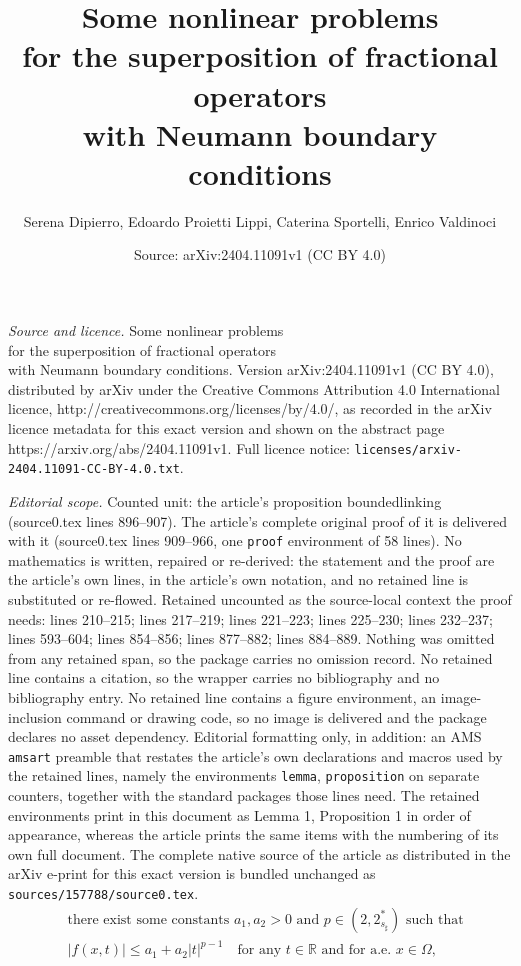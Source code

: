 \documentclass[10pt,a4paper]{amsart}
\title{Some nonlinear problems\\ for the superposition of fractional operators\\ with Neumann boundary conditions}
\author{Serena Dipierro, Edoardo Proietti Lippi, Caterina Sportelli, Enrico Valdinoci}
\date{Source: arXiv:2404.11091v1 (CC BY 4.0)}
\def \R {\mathbb{R}}
\renewcommand{\leq}{\leqslant}
\begin{document}
\maketitle

\noindent\emph{Source and licence.} Some nonlinear problems\\ for the superposition of fractional operators\\ with Neumann boundary conditions. Version arXiv:2404.11091v1 (CC BY 4.0), distributed by arXiv under the Creative Commons Attribution 4.0 International licence, http://creativecommons.org/licenses/by/4.0/, as recorded in the arXiv licence metadata for this exact version and shown on the abstract page https://arxiv.org/abs/2404.11091v1. Full licence notice: \texttt{licenses/arxiv-2404.11091-CC-BY-4.0.txt}.\par\smallskip

\noindent\textit{Editorial scope.} Counted unit: the article's proposition boundedlinking (source0.tex lines 896--907). The article's complete original proof of it is delivered with it (source0.tex lines 909--966, one \texttt{proof} environment of 58 lines). No mathematics is written, repaired or re-derived: the statement and the proof are the article's own lines, in the article's own notation, and no retained line is substituted or re-flowed.  Retained uncounted as the source-local context the proof needs: lines 210--215; lines 217--219; lines 221--223; lines 225--230; lines 232--237; lines 593--604; lines 854--856; lines 877--882; lines 884--889.  Nothing was omitted from any retained span, so the package carries no omission record.  No retained line contains a citation, so the wrapper carries no bibliography and no bibliography entry.  No retained line contains a figure environment, an image-inclusion command or drawing code, so no image is delivered and the package declares no asset dependency.  Editorial formatting only, in addition: an AMS \texttt{amsart} preamble that restates the article's own declarations and macros used by the retained lines, namely the environments \texttt{lemma}, \texttt{proposition} on separate counters, together with the standard packages those lines need.  The retained environments print in this document as Lemma 1, Proposition 1 in order of appearance, whereas the article prints the same items with the numbering of its own full document.  The complete native source of the article as distributed in the arXiv e-print for this exact version is bundled unchanged as \texttt{sources/157788/source0.tex}.
\begin{equation}\label{AR1}
\begin{split}
&\mbox{there exist some constants $a_1,a_2>0$ and $p\in (2, 2^*_{s_\sharp})$ such that} \\
&|f(x,t)|\leq a_1+a_2|t|^{p-1} \quad\mbox{for any } t\in \R \mbox{ and for a.e. } x\in \Omega,\\
\end{split}
\end{equation}
\end{document}
